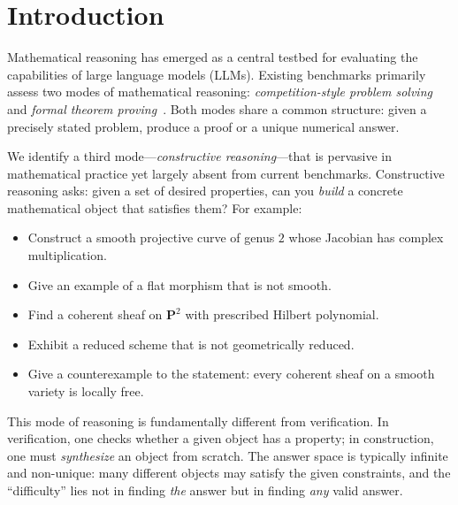 \section{Introduction}
\label{sec:introduction}

Mathematical reasoning has emerged as a central testbed for evaluating the capabilities of large language models (LLMs).
Existing benchmarks primarily assess two modes of mathematical reasoning: \emph{competition-style problem solving}~\citep{hendrycks2021measuring, zhong2023agieval} and \emph{formal theorem proving}~\citep{tsoukalas2024putnambench, zheng2022minif2f}.
Both modes share a common structure: given a precisely stated problem, produce a proof or a unique numerical answer.

We identify a third mode---\emph{constructive reasoning}---that is pervasive in mathematical practice yet largely absent from current benchmarks.
Constructive reasoning asks: given a set of desired properties, can you \emph{build} a concrete mathematical object that satisfies them?
For example:
\begin{itemize}[nosep]
  \item Construct a smooth projective curve of genus $2$ whose Jacobian has complex multiplication.
  \item Give an example of a flat morphism that is not smooth.
  \item Find a coherent sheaf on $\mathbf{P}^2$ with prescribed Hilbert polynomial.
  \item Exhibit a reduced scheme that is not geometrically reduced.
  \item Give a counterexample to the statement: every coherent sheaf on a smooth variety is locally free.
\end{itemize}

This mode of reasoning is fundamentally different from verification.
In verification, one checks whether a given object has a property; in construction, one must \emph{synthesize} an object from scratch.
The answer space is typically infinite and non-unique: many different objects may satisfy the given constraints, and the ``difficulty'' lies not in finding \emph{the} answer but in finding \emph{any} valid answer.

